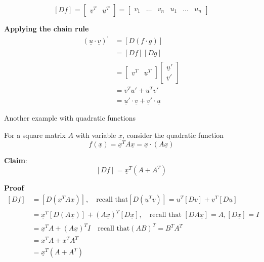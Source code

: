    \[
     \left[ D f \right]_{}  = \begin{bmatrix} 
        \underline{v}^T & \underline{u}^T  
     \end{bmatrix} = \begin{bmatrix} 
        v_1 & \hdots & v_n & u_1 &\hdots   & u_n
     \end{bmatrix}
   \] 

   \textbf{Applying the chain rule}
   \begin{align*}
      ( \underline{u} \cdot \underline{v} ) ^{\prime} &= \left[ D (f \cdot g) \right]_{} \\
                                                      &= \left[ D f \right]_{} \left[ D g \right]_{} \\
                                                      &= \begin{bmatrix} 
                                                         \underline{v}^T &\underline{u}^T  
                                                      \end{bmatrix} \begin{bmatrix} 
                                                        \underline{u}' \\ \underline{v}'  
                                                      \end{bmatrix} \\
                                                      &= \underline{v}^T \underline{u}' + \underline{u}^T \underline{v}' \\
                                                      &= \underline{u}' \cdot \underline{v} + \underline{v}' \cdot \underline{u}
\end{align*}

Another example with quadratic functions

For a square matrix $A$ with variable $ \underline{x}$, consider the quadratic function \[
  f( \underline{x}) = \underline{x}^T A \underline{x} = \underline{x} \cdot (A \underline{x})
\] 

\textbf{Claim}: \[
  \left[ D f \right]_{} = \underline{x}^T (A + A^T)
\] 

\textbf{Proof} 
\begin{align*}
   \left[ D f \right]_{} &= \left[ D  (\underline{x}^T A \underline{x}) \right]_{}, \quad \text{recall that} \left[ D ( \underline{u}^T \underline{v}) \right]_{} = \underline{u}^T \left[ D v \right]_{}  + \underline{v}^T \left[ D \underline{u} \right]_{} \\
                         &= \underline{x}^T \left[ D (A \underline{x}) \right]_{}  + (A \underline{x})^T \left[ D  \underline{x} \right]_{}, \quad \text{recall that } \left[ D A \underline{x} \right]_{}  = A, \left[ D \underline{x} \right]_{} = I \\
                         &= \underline{x}^T A + (A \underline{x})^T I \quad \text{recall that} (AB)^T = B^T A^T \\
                         &= \underline{x}^T A + \underline{x}^T A^T  \\
                         &= \underline{x}^T (A + A^T)
\end{align*}

